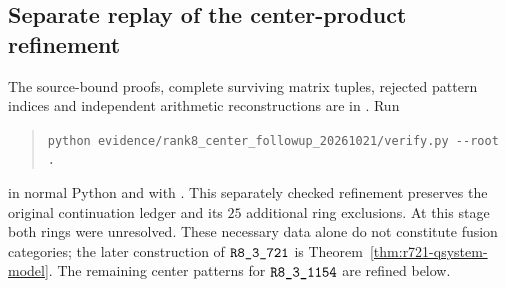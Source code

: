 \subsection{Separate replay of the center-product refinement}
The source-bound proofs, complete surviving matrix tuples, rejected pattern
indices and independent arithmetic reconstructions are in
. Run
\begin{quote}\small
\verb|python evidence/rank8_center_followup_20261021/verify.py --root .|
\end{quote}
in normal Python and with . This separately checked refinement
preserves the original continuation ledger and its $25$ additional ring
exclusions. At this stage both rings were unresolved. These necessary
data alone do not constitute fusion categories; the later construction of
$\sha{R8_3_721}$ is Theorem~\ref{thm:r721-qsystem-model}. The remaining
center patterns for $\sha{R8_3_1154}$ are refined below.
